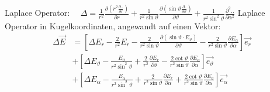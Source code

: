 Laplace Operator:   $\quad \Delta=\frac{1}{r^{2}} \frac{\partial\left(r^{2} \frac{\partial . .}{\partial r}\right)}{\partial r}+\frac{1}{r^{2} \sin \vartheta} \frac{\partial\left(\sin \vartheta \frac{\partial . \ddot{ }}{\partial \vartheta}\right)}{\partial \vartheta}+\frac{1}{r^{2} \sin ^{2} \vartheta} \frac{\partial^{2} . .}{\partial \alpha^{2}}$
Laplace Operator in Kugelkoordinaten, angewandt auf einen Vektor:
\begin{align*}
    \Delta \vec{E} &=\left[\Delta E_{r}-\frac{2}{r^{2}} E_{r}-\frac{2}{r^{2} \sin \vartheta} \frac{\partial\left(\sin \vartheta \cdot E_{\vartheta}\right)}{\partial \vartheta}-\frac{2}{r^{2} \sin \vartheta} \frac{\partial E_{\alpha}}{\partial \alpha}\right] \vec{e_{r}} \\
    &+\left[\Delta E_{\vartheta}-\frac{E_{\vartheta}}{r^{2} \sin ^{2} \vartheta}+\frac{2}{r^{2}} \frac{\partial E_{r}}{\partial \vartheta}-\frac{2 \cot \vartheta}{r^{2} \sin \vartheta} \frac{\partial E_{\alpha}}{\partial \alpha}\right] \vec{e_{\vartheta}} \\
    &+\left[\Delta E_{\alpha}-\frac{E_{\alpha}}{r^{2} \sin ^{2} \vartheta}+\frac{2}{r^{2} \sin \vartheta} \frac{\partial E_{r}}{\partial \alpha}+\frac{2 \cot \vartheta}{r^{2} \sin \vartheta} \frac{\partial E_{\vartheta}}{\partial \alpha}\right] \vec{e_{\alpha}}
\end{align*}

 

